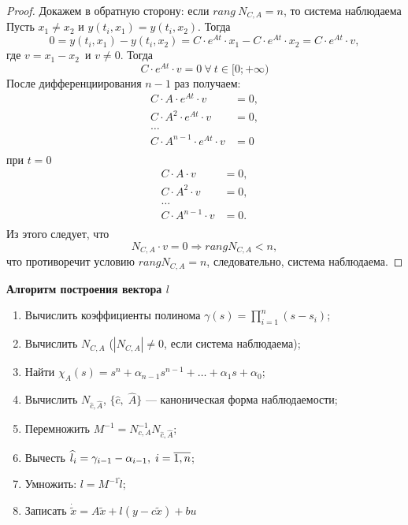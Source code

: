 \documentclass[../../TAU.tex]{subfiles}
\begin{document}
\begin{proof}
        Докажем в обратную сторону: если $rang\ N_{C, A}=n$, то система наблюдаема\\
        Пусть $x_1\neq x_2$ и $y(t_i,x_1)=y(t_i,x_2)$.
        Тогда 
        $$
            0=y(t_i,x_1)-y(t_i,x_2)=C\cdot e^{At}\cdot x_1-C\cdot e^{At}\cdot x_2=C\cdot e^{At}\cdot v,
        $$ 
        где $v=x_1-x_2$\ и $v\neq 0$. 
        Тогда 
        $$
            C\cdot e^{At}\cdot v = 0\ \forall\ t\in [0; +\infty)
        $$
        После дифференциирования $n-1$ раз получаем:
        \begin{align*}
            C\cdot A      \cdot e^{At}\cdot v &= 0, \\
            C\cdot A^2    \cdot e^{At}\cdot v &= 0, \\
            \dots                                   \\
            C\cdot A^{n-1}\cdot e^{At}\cdot v &= 0 \\
        \end{align*}
        при $t=0$
        \begin{align*}
            C\cdot A      \cdot v &= 0, \\
            C\cdot A^2    \cdot v &= 0, \\
            \dots                       \\
            C\cdot A^{n-1}\cdot v &= 0.  \\
        \end{align*}
        Из этого следует, что
        $$
        N_{C, A}\cdot v = 0 \Rightarrow rang N_{C, A}<n,
        $$ 
        что противоречит условию $rang N_{C, A}=n$, следовательно, система наблюдаема.
    \end{proof}

    \textbf{Алгоритм построения вектора $l$}

    \begin{enumerate}
        \item Вычислить коэффициенты полинома $\gamma(s) = \prod_{i=1}^{n}(s-s_i)$;
        \item Вычислить $N_{C,A}$ ($|N_{C,A}|\neq0$, если система наблюдаема);
        \item Найти $\chi_A(s) = s^n + \alpha_{n-1}s^{n-1} + \ldots + \alpha_1 s + \alpha_0$;
        \item Вычислить $N_{\widehat c, \widehat A}$, $\{\widehat c,\; \widehat A\}$ --- каноническая форма наблюдаемости;
        \item Перемножить $M^{-1} = N^{-1}_{c, A} N_{\widehat c, \widehat A}$;
        \item Вычесть $\widehat l_i = \gamma_{i-1} - \alpha_{i-1}, \; i=\overline{1,n}$;
        \item Умножить: $l =  M^{-1}\widehat l$;
        \item Записать $\dot{\tilde x} = A\tilde x + l(y - c\tilde x ) + b u$
    \end{enumerate}
\end{document}
